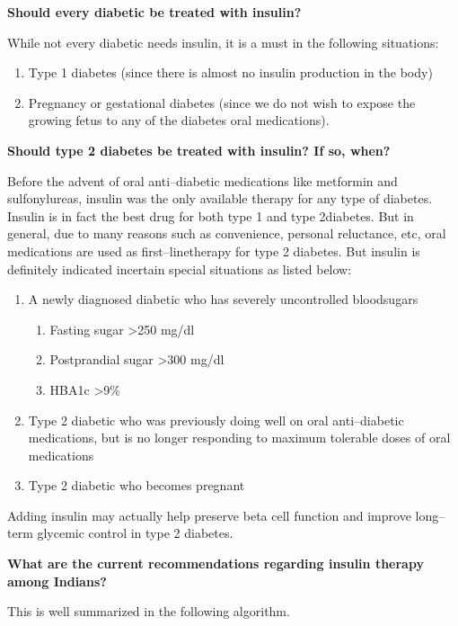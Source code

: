 \noindent\textbf{Should every diabetic be treated with insulin?}

While not every diabetic needs insulin, it is a must in the following situations:

\begin{enumerate}[•]
\itemsep=0pt
\item Type 1 diabetes (since there is almost no insulin production in the body)
\item Pregnancy or gestational diabetes (since we do not wish to expose the growing fetus to any of the diabetes oral medications).
\end{enumerate}

\noindent\textbf{Should type 2 diabetes be treated with insulin? If so, when?}

Before the advent of oral anti–diabetic medications like metformin and sulfonylureas, insulin was the only available therapy for any type of diabetes. Insulin is in fact the best drug for both type 1 and type 2\break diabetes. But in general, due to many reasons such as convenience, personal reluctance, etc, oral medications are used as first–line\break therapy for type 2 diabetes. But insulin is definitely indicated in\break certain special situations as listed below:

\begin{enumerate}[•]
\itemsep=0pt
\item A newly diagnosed diabetic who has severely uncontrolled blood\break sugars
\begin{enumerate}[•]
\itemsep=0pt
\item Fasting sugar \textgreater  250 mg/dl
\item Postprandial sugar \textgreater  300 mg/dl
\item HBA1c \textgreater 9\%
\end{enumerate}
\item Type 2 diabetic who was previously doing well on oral anti–diabetic medications, but is no longer responding to maximum tolerable doses of oral medications
\item Type 2 diabetic who becomes pregnant
\end{enumerate}

Adding insulin may actually help preserve beta cell function and improve long–term glycemic control in type 2 diabetes.

\noindent\textbf{What are the current recommendations regarding insulin therapy among Indians?}

This is well summarized in the following algorithm.

